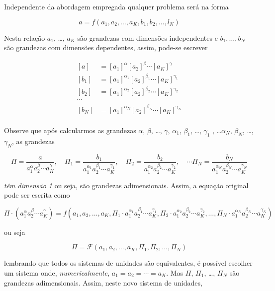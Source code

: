 Independente da abordagem empregada qualquer problema será na forma

\[
a = f\left(a_1, a_2, \ldots, a_K, b_1, b_2, \ldots, l_N\right)
\]

Nesta relação $a_1$, \ldots, $a_K$ são grandezas com dimensões independentes e $b_1, \ldots, b_N$ são grandezas com dimensões dependentes, assim, pode-se escrever

\[
\begin{aligned}
  \left[a\right]  &= [a_1]^{\alpha}[a_2]^{\beta} \cdots [a_K]^{\gamma}\\
  \left[b_1\right] &= [a_1]^{\alpha_1}[a_2]^{\beta_1} \cdots [a_K]^{\gamma_1}\\
  \left[b_2\right] &= [a_1]^{\alpha_2}[a_2]^{\beta_2} \cdots [a_K]^{\gamma_2}\\
  \cdots &\\
  \left[b_N\right] &= [a_1]^{\alpha_N}[a_2]^{\beta_N} \cdots [a_K]^{\gamma_N}\\
\end{aligned}
\]

Observe que após calcularmos as grandezas $\alpha$, $\beta$, \ldots, $\gamma$, $\alpha_1$, $\beta_1$, \ldots, $\gamma_1$ , \ldots $\alpha_N$, $\beta_N$, \ldots, $\gamma_N$,
as grandezas

\[
\Pi = \frac{a}{a_1^\alpha a_2^\beta\cdots a_K^\gamma}, \quad
\Pi_1 = \frac{b_1}{a_1^{\alpha_1} a_2^{\beta_1}\cdots a_K^{\gamma_1}},\quad
\Pi_2 = \frac{b_2}{a_1^{\alpha_2} a_2^{\beta_2}\cdots a_K^{\gamma_2}},\quad
\cdots
\Pi_N = \frac{b_N}{a_1^{\alpha_N} a_2^{\beta_N}\cdots a_K^{\gamma_N}}
\]

\emph{têm dimensão 1} ou seja, são grandezas adimensionais. Assim, a equação original pode ser escrita como

\[
\Pi \cdot \left({a_1^\alpha a_2^\beta\cdots a_K^\gamma}\right) =
f\left( a_1, a_2, \ldots, a_K,
\Pi_1 \cdot a_1^{\alpha_1} a_2^{\beta_1}\cdots a_K^{\gamma_1}, 
\Pi_2 \cdot a_1^{\alpha_2} a_2^{\beta_2}\cdots a_K^{\gamma_2}, 
\ldots,
\Pi_N \cdot a_1^{\alpha_N} a_2^{\beta_N}\cdots a_K^{\gamma_N}
\right)
\]

ou seja

\[
\Pi = \mathcal{F}\left(a_1, a_2, \ldots, a_K, \Pi_1, \Pi_2, \ldots, \Pi_N \right)
\]

lembrando que todos os sistemas de unidades são equivalentes, é possível escolher um sistema onde, \emph{numericalmente}, $a_1 = a_2 = \cdots = a_K$. Mas $\Pi$, $\Pi_1$, \ldots, $\Pi_N$ são grandezas adimensionais. Assim, neste novo sistema de unidades, 

